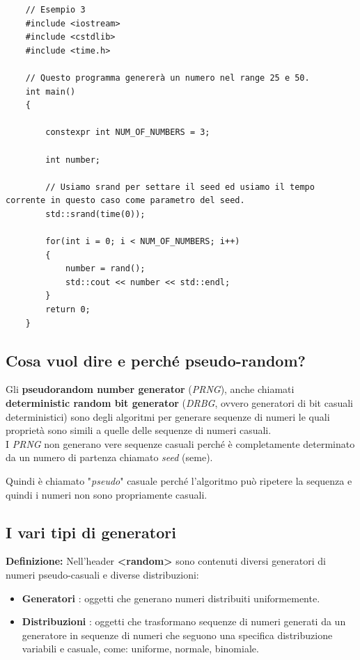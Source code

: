 \begin{lstlisting}
	// Esempio 3
	#include <iostream>
	#include <cstdlib>
	#include <time.h>
	
	// Questo programma genererà un numero nel range 25 e 50.
	int main()
	{
		
		constexpr int NUM_OF_NUMBERS = 3;
		
		int number;
		
		// Usiamo srand per settare il seed ed usiamo il tempo corrente in questo caso come parametro del seed.
		std::srand(time(0));
		
		for(int i = 0; i < NUM_OF_NUMBERS; i++)
		{
			number = rand();
			std::cout << number << std::endl;
		}
		return 0;
	}
\end{lstlisting}

\subsection{Cosa vuol dire e perché pseudo-random?}

\textsf{\small Gli \textbf{pseudorandom number generator} (\emph{PRNG}), anche chiamati \textbf{deterministic random bit generator} (\emph{DRBG}, ovvero generatori di bit casuali deterministici) sono degli algoritmi per generare sequenze di numeri le quali proprietà sono simili a quelle delle sequenze di numeri casuali.} \\

\textsf{\small I \emph{PRNG} non generano vere sequenze casuali perché è completamente determinato da un numero di partenza chiamato \emph{seed} (seme).} \break

\textsf{\small Quindi è chiamato "\emph{pseudo}" casuale perché l'algoritmo può ripetere la sequenza e quindi i numeri non sono propriamente casuali.} \\

\subsection{I vari tipi di generatori}

\textsf{\small \textbf{Definizione: } Nell'header \textbf{<random>} sono contenuti diversi generatori di numeri pseudo-casuali e diverse distribuzioni:} \\

\begin{itemize}
	\item \textsf{\small \textbf{Generatori} : oggetti che generano numeri distribuiti uniformemente.}
	\item \textsf{\small \textbf{Distribuzioni} : oggetti che trasformano sequenze di numeri generati da un generatore in sequenze di numeri che seguono una specifica distribuzione variabili e casuale, come: uniforme, normale, binomiale.}
\end{itemize}

